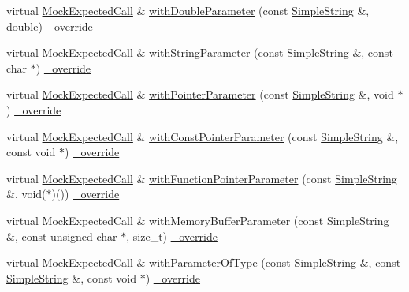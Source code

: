 \begin{DoxyCompactItemize}
\item 
virtual \hyperlink{class_mock_expected_call}{Mock\+Expected\+Call} \& \hyperlink{class_mock_ignored_expected_call_ab1b0bbbfd3c80b2db5b1e2980069af96}{with\+Double\+Parameter} (const \hyperlink{class_simple_string}{Simple\+String} \&, double) \hyperlink{_cpp_u_test_config_8h_a049bea15dd750e15869863c94c1efc3b}{\+\_\+override}
\item 
virtual \hyperlink{class_mock_expected_call}{Mock\+Expected\+Call} \& \hyperlink{class_mock_ignored_expected_call_a6c94eaa29228277505665de084252ce3}{with\+String\+Parameter} (const \hyperlink{class_simple_string}{Simple\+String} \&, const char $\ast$) \hyperlink{_cpp_u_test_config_8h_a049bea15dd750e15869863c94c1efc3b}{\+\_\+override}
\item 
virtual \hyperlink{class_mock_expected_call}{Mock\+Expected\+Call} \& \hyperlink{class_mock_ignored_expected_call_a217921df6f7615e71494d9ef69823768}{with\+Pointer\+Parameter} (const \hyperlink{class_simple_string}{Simple\+String} \&, void $\ast$) \hyperlink{_cpp_u_test_config_8h_a049bea15dd750e15869863c94c1efc3b}{\+\_\+override}
\item 
virtual \hyperlink{class_mock_expected_call}{Mock\+Expected\+Call} \& \hyperlink{class_mock_ignored_expected_call_aa8b4ed3b398dda07c7612638346aa9b6}{with\+Const\+Pointer\+Parameter} (const \hyperlink{class_simple_string}{Simple\+String} \&, const void $\ast$) \hyperlink{_cpp_u_test_config_8h_a049bea15dd750e15869863c94c1efc3b}{\+\_\+override}
\item 
virtual \hyperlink{class_mock_expected_call}{Mock\+Expected\+Call} \& \hyperlink{class_mock_ignored_expected_call_a0761f6967a82b3b6a9caea184f166d15}{with\+Function\+Pointer\+Parameter} (const \hyperlink{class_simple_string}{Simple\+String} \&, void($\ast$)()) \hyperlink{_cpp_u_test_config_8h_a049bea15dd750e15869863c94c1efc3b}{\+\_\+override}
\item 
virtual \hyperlink{class_mock_expected_call}{Mock\+Expected\+Call} \& \hyperlink{class_mock_ignored_expected_call_a828a8029ecfe5802fecdbaf55aeea1d8}{with\+Memory\+Buffer\+Parameter} (const \hyperlink{class_simple_string}{Simple\+String} \&, const unsigned char $\ast$, size\+\_\+t) \hyperlink{_cpp_u_test_config_8h_a049bea15dd750e15869863c94c1efc3b}{\+\_\+override}
\item 
virtual \hyperlink{class_mock_expected_call}{Mock\+Expected\+Call} \& \hyperlink{class_mock_ignored_expected_call_a8218ff15f5ad2e7f73188f3e8f1ff32f}{with\+Parameter\+Of\+Type} (const \hyperlink{class_simple_string}{Simple\+String} \&, const \hyperlink{class_simple_string}{Simple\+String} \&, const void $\ast$) \hyperlink{_cpp_u_test_config_8h_a049bea15dd750e15869863c94c1efc3b}{\+\_\+override}

\end{DoxyCompactItemize}
